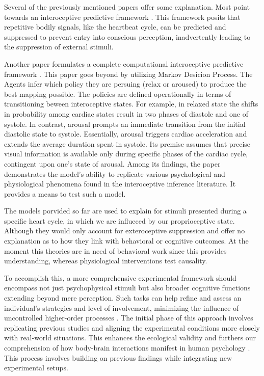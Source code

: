 \documentclass[12pt,oneside,openright]{report}
\begin{document}
Several of the previously mentioned papers offer some explanation. Most point towards an interoceptive predictive framework . This framework posits that repetitive bodily signals, like the heartbeat cycle, can be predicted and suppressed to prevent entry into conscious perception, inadvertently leading to the suppression of external stimuli\parencite{AL2021118247, SALTAFOSSI2023108642,Allen2022}. 

Another paper formulates a complete computational interoceptive predictive framework \parencite{Allen2022}. This paper goes beyond by utilizing Markov Desicion Process. The Agents infer which policy they are persuing (relax or aroused) to produce the best mapping possible. The policies are defined operationally in terms of transitioning beween interoceptive states. For example, in relaxed state the shifts in probability among cardiac states result in two phases of diastole and one of systole. In contrast, arousal prompts an immediate transition from the initial diastolic state to systole. Essentially, arousal triggers cardiac acceleration and extends the average duration spent in systole. Its premise assumes that precise visual information is available only during specific phases of the cardiac cycle, contingent upon one's state of arousal. Among its findings, the paper demonstrates the model's ability to replicate various psychological and physiological phenomena found in the interoceptive inference literature. It provides a means to test such a model.

The models porvided so far are used to explain for stimuli presented during a specific heart cycle, in which we are influeced by our proprioceptive state. Although they would only account for exteroceptive suppression and offer no explanation as to how they link with behavioral or cognitive outcomes. At the moment this theories are in need of behavioral work since this provides understanding, whereas physiological interventions test causality\parencite{KRAKAUER2017480}.

To accomplish this, a more comprehensive experimental framework should encompass not just psychophysical stimuli but also broader cognitive functions extending beyond mere perception. Such tasks can help refine and assess an individual's strategies and level of involvement, minimizing the influence of uncontrolled higher-order processes \parencite{WASKOM2019100}. The initial phase of this approach involves replicating previous studies and aligning the experimental conditions more closely with real-world situations. This enhances the ecological validity and furthers our comprehension of how body-brain interactions manifest in human psychology \parencite{schmuckler2001ecological}. This process involves building on previous findings while integrating new experimental setups.
\end{document}
